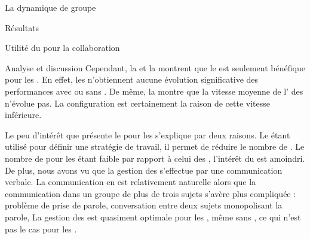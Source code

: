 \documentclass[myfrancais,ngerman,english,frenchb]{mythesis}
\begin{document}
\begin{mychapter}{La dynamique de groupe}
\begin{mysection}{Résultats}
\begin{mysubsection}{Utilité du \mybrainstorming pour la collaboration}
\begin{mysubsubsection}{Analyse et discussion}
					Cependant, la  et la  montrent que le \mybrainstorming est seulement bénéfique pour les .
					En effet, les  n'obtiennent aucune évolution significative des performances avec ou sans \mybrainstorming.
					De même, la  montre que la vitesse moyenne de l' des  n'évolue pas.
					La configuration  est certainement la raison de cette vitesse inférieure.

					Le peu d'intérêt que présente le \mybrainstorming pour les  s'explique par deux raisons.
					Le \mybrainstorming étant utilisé pour définir une stratégie de travail, il permet de réduire le nombre de .
					Le nombre de  pour les  étant faible par rapport à celui des , l'intérêt du \mybrainstorming est amoindri.
					De plus, nous avons vu que la gestion des  s'effectue par une communication verbale.
					La communication en  est relativement naturelle alors que la communication dans un groupe de plus de trois sujets s'avère plus compliquée : problème de prise de parole, conversation entre deux sujets monopolisant la parole, \myetc
					La gestion des  est quasiment optimale pour les , même sans \mybrainstorming, ce qui n'est pas le cas pour les .


\end{mysubsubsection}
\end{mysubsection}
\end{mysection}
\end{mychapter}
\end{document}

